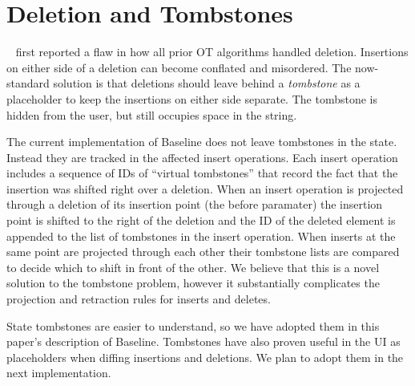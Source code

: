 \documentclass[english,submission]{programming}
\theoremstyle{definition}
\newcommand{\citet}[1]{\citeauthor*{#1}~\cite{#1}}
\begin{document}
\acks

\appendix

\section{Deletion and Tombstones}\label{deletion}

\citet{Oster06} first reported a flaw in how all prior OT algorithms handled deletion. Insertions on either side of a deletion can become conflated and misordered.
The now-standard solution is that deletions should leave behind a \textit{tombstone} as a placeholder to keep the insertions on either side separate. The tombstone is hidden from the user, but still occupies space in the string.

The current implementation of Baseline does not leave tombstones in the state. Instead they are tracked in the affected \textsf{insert} operations. Each insert operation includes a sequence of IDs of ``virtual tombstones'' that record the fact that the insertion was shifted right over a deletion.
When an insert operation is projected through a deletion of its insertion point (the \textsf{before} paramater) the insertion point is shifted to the right of the deletion and the ID of the deleted element is appended to the list of tombstones in the insert operation. When inserts at the same point are projected through each other their tombstone lists are compared to decide which to shift in front of the other. We believe that this is a novel solution to the tombstone problem,
however it substantially complicates the projection and retraction rules for inserts and deletes.

State tombstones are easier to understand, so we have adopted them in this paper's description of Baseline. Tombstones have also proven useful in the UI as placeholders when diffing insertions and deletions. We plan to adopt them in the next implementation.
\end{document}
